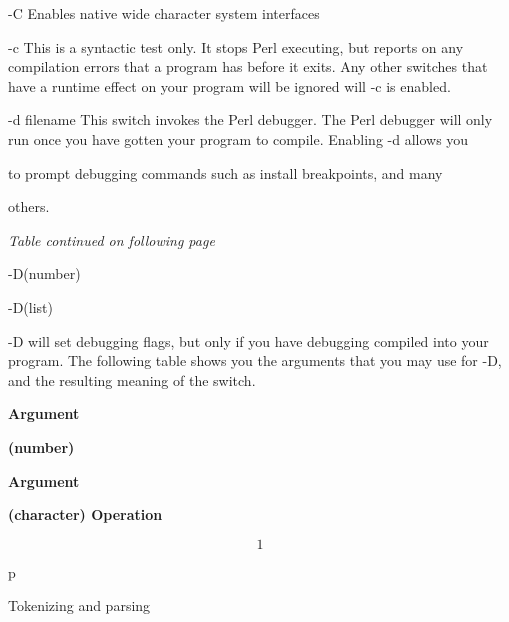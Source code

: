 \documentclass[a4paper,11pt]{book}
\begin{document}
\noindent 

\noindent -C Enables native wide character system interfaces

\noindent 

\noindent -c This is a syntactic test only. It stops Perl executing, but reports on any compilation errors that a program has before it exits. Any other switches that have a runtime effect on your program will be ignored will -c is enabled.

\noindent 

\noindent -d filename This switch invokes the Perl debugger. The Perl debugger will only run once you have gotten your program to compile. Enabling -d allows you

\noindent to prompt debugging commands such as install breakpoints, and many

\noindent others.

\noindent 

\noindent \textit{Table continued on following page}

   

   

\noindent  

\noindent  

\noindent 

\noindent -D(number)

\noindent 

\noindent 

\noindent -D(list)

\noindent 

\noindent -D will set debugging flags, but only if you have debugging compiled into your program. The following table shows you the arguments that you may use for -D, and the resulting meaning of the switch.

\noindent 

\noindent \textbf{Argument}

\noindent \textbf{(number)}

\noindent 

\noindent \textbf{Argument}

\noindent \textbf{(character) Operation}

\noindent 

\noindent 

\[1\] 


\noindent p

\noindent 

\noindent Tokenizing and parsing

\noindent 
\end{document}
